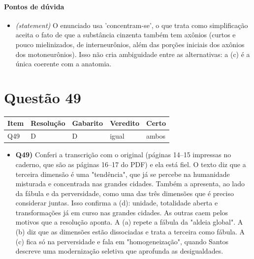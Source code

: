 \documentclass{article}%
\begin{document}
\paragraph{Pontos de dúvida}%
\begin{itemize}%
\item%
\textit{(statement)} O enunciado usa 'concentram{-}se', o que trata como simplificação aceita o fato de que a substância cinzenta também tem axônios (curtos e pouco mielinizados, de interneurônios, além das porções iniciais dos axônios dos motoneurônios). Isso não cria ambiguidade entre as alternativas: a (c) é a única coerente com a anatomia.%
\end{itemize}%
\section*{Questão 49}%
\begin{longtable}{@{}p{} p{} p{} p{} p{}@{}}\toprule Item & Resolução & Gabarito & Veredito & Certo \\ \midrule
Q49 & D & D & igual & ambos \\
\bottomrule\end{longtable}%
\begin{itemize}%
\item%
\textbf{Q49)} Conferi a transcrição com o original (páginas 14--15 impressas no caderno, que são as páginas 16--17 do PDF) e ela está fiel. O texto diz que a terceira dimensão é uma "tendência", que já se percebe na humanidade misturada e concentrada nas grandes cidades. Também a apresenta, ao lado da fábula e da perversidade, como uma das três dimensões que é preciso considerar juntas. Isso confirma a (d): unidade, totalidade aberta e transformações já em curso nas grandes cidades. As outras caem pelos motivos que a resolução aponta. A (a) repete a fábula da "aldeia global". A (b) diz que as dimensões estão dissociadas e trata a terceira como fábula. A (c) fica só na perversidade e fala em "homogeneização", quando Santos descreve uma modernização seletiva que aprofunda as desigualdades.%
\end{itemize}%
\end{document}
